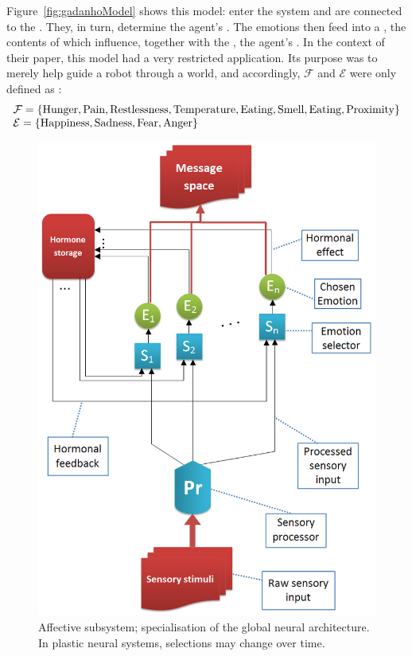 Figure~\ref{fig:gadanhoModel} shows this model:  enter the system and are connected to the . They, in turn, determine the agent's . The emotions then feed into a , the contents of which influence, together with the , the agent's . In the context of their paper, this model had a very restricted application. Its purpose was to merely help guide a robot through a world, and accordingly, $\mathcal{F}$ and $\mathcal{E}$ were only defined as \cite[p. 47]{DBLP:journals/adb/GadanhoH01}:
$$
	\begin{array}{l}
		\mathcal{F} = \{ \textnormal{Hunger}, \textnormal{Pain}, \textnormal{Restlessness},
						 \textnormal{Temperature}, \textnormal{Eating}, \textnormal{Smell},
						 \textnormal{Eating}, \textnormal{Proximity} \}\\
		\mathcal{E} = \{ \textnormal{Happiness}, \textnormal{Sadness}, \textnormal{Fear},
						 \textnormal{Anger} \}
	\end{array}
$$

\begin{figure}[!h]
	\centering
	\includegraphics[width=400pt]{Figs/affectiveSubsystem.png}
	\caption{Affective subsystem; specialisation of the global neural architecture. In plastic neural systems, selections may change over time.}
	\label{fig:affectiveSubsystem}
\end{figure}


